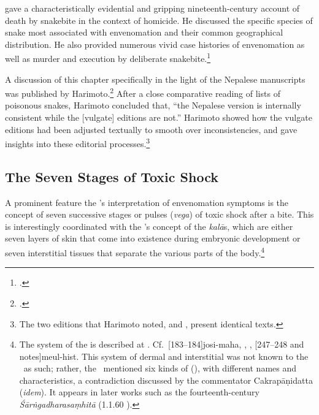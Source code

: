 \citeauthor{chev-1870} gave a characteristically evidential and
gripping nineteenth-century account of death by snakebite in the
context of homicide.  He discussed the specific species of snake most
associated with envenomation and their common geographical
distribution. He also provided numerous vivid case histories of
envenomation as well as murder and execution by deliberate
snakebite.\footcite[368--386]{chev-1870}
    
A discussion of this chapter specifically in the light of the
Nepalese manuscripts was published by
Harimoto.\footcite[101--104]{hari-2011} After a close comparative
reading of lists of poisonous snakes, Harimoto concluded that, “the
Nepalese version is internally consistent while the [vulgate]
editions are not.”  Harimoto showed how the vulgate editions had been
adjusted textually to smooth over inconsistencies, and gave insights
into these editorial processes.\footnote{The two editions that
    Harimoto noted, \cite{vulgate} and \cite{bhat-1889}, present
    identical texts.}

\subsection{The Seven Stages of Toxic Shock}

A prominent feature the \SS's interpretation of envenomation symptoms
is the concept of seven successive stages or pulses
(\emph{vega}) of toxic shock after a bite. This is
interestingly coordinated with the \SS's concept of the \emph{kalā}s,
which are either seven layers of skin that come into
existence during embryonic development or seven interstitial tissues
that separate the various parts of the
body.\footnote{\label{ka4:kalā}The system of the  is
    described at .  Cf.\
    [183--184]{josi-maha}, \cite[227--228]{gupt-1983},
    \cite[6]{kutu-1962}, \volcite{1}[247--248 and notes]{meul-hist}. 
    This system of dermal and interstitial \dev{kalā} was not known to
    the \CS\ as such; rather, the \CS\ mentioned six kinds of
     (), with different names and
    characteristics, a contradiction discussed by the commentator
    Cakrapāṇidatta (\textit{idem}). It appears in later works such as the
    fourteenth-century \emph{Śārṅgadharasaṃhitā} (1.1.60
    \citep[15]{sast-1931}).}
    
